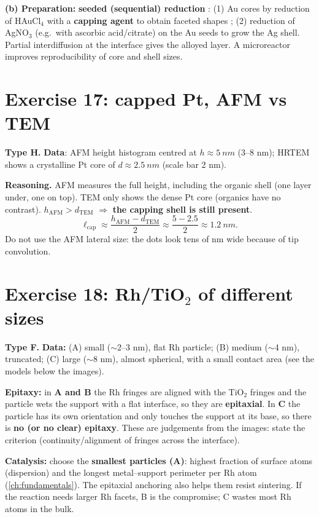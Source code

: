 \textbf{(b) Preparation:} \textbf{seeded (sequential) reduction} : (1) Au cores by reduction of HAuCl$_4$ with a
\textbf{capping agent} to obtain faceted shapes ; (2) reduction of AgNO$_3$ (e.g.\ with ascorbic acid/citrate) on the
Au seeds to grow the Ag shell. Partial interdiffusion at the interface gives the alloyed layer. A microreactor improves
reproducibility of core and shell sizes.

\section{Exercise 17: capped Pt, AFM vs TEM}
\textbf{Type H.} \textbf{Data}\readoff: AFM height histogram centred at $h\approx\SI{5}{nm}$ (3--8 nm); HRTEM shows a crystalline Pt
core of $d\approx\SI{2.5}{nm}$ (scale bar 2 nm).

\textbf{Reasoning.} AFM measures the full height, including the organic shell (one layer under, one on top). TEM only shows
the dense Pt core (organics have no contrast). $h_\mathrm{AFM} > d_\mathrm{TEM}$ $\Rightarrow$ \textbf{the capping shell is
still present}.
\[
\ell_\mathrm{cap}\approx\frac{h_\mathrm{AFM}-d_\mathrm{TEM}}{2}\approx\frac{5-2.5}{2}\approx\boxed{\SI{1.2}{nm}}.
\]
Do not use the AFM lateral size: the dots look tens of nm wide because of tip convolution.

\section{Exercise 18: Rh/TiO$_2$ of different sizes}
\textbf{Type F.} \textbf{Data:} (A) small ($\sim$2--3 nm), flat Rh particle; (B) medium ($\sim$4 nm), truncated; (C) large
($\sim$8 nm), almost spherical, with a small contact area (see the models below the images).

\textbf{Epitaxy:} in \textbf{A and B} the Rh fringes are aligned with the TiO$_2$ fringes and the particle wets the support with a
flat interface, so they are \textbf{epitaxial}. In \textbf{C} the particle has its own orientation and only touches the support
at its base, so there is \textbf{no (or no clear) epitaxy}. These are judgements from the images: state the criterion
(continuity/alignment of fringes across the interface).

\textbf{Catalysis:} choose the \textbf{smallest particles (A)}: highest fraction of surface atoms (dispersion) and the longest
metal--support perimeter per Rh atom (\cref{ch:fundamentals}). The epitaxial anchoring also helps them resist sintering.
If the reaction needs larger Rh facets, B is the compromise; C wastes most Rh atoms in the bulk.
